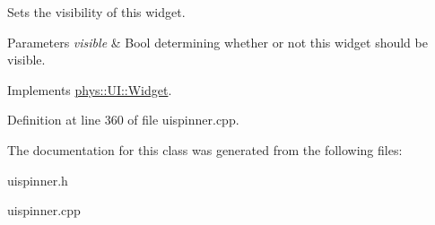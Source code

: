 Sets the visibility of this widget. 


\begin{DoxyParams}{Parameters}
{\em visible} & Bool determining whether or not this widget should be visible. \\
\hline
\end{DoxyParams}


Implements \hyperlink{classphys_1_1UI_1_1Widget_ab049233d8d5522a6ab42654b8924a3e0}{phys::UI::Widget}.



Definition at line 360 of file uispinner.cpp.



The documentation for this class was generated from the following files:\begin{DoxyCompactItemize}
\item 
uispinner.h\item 
uispinner.cpp\end{DoxyCompactItemize}
